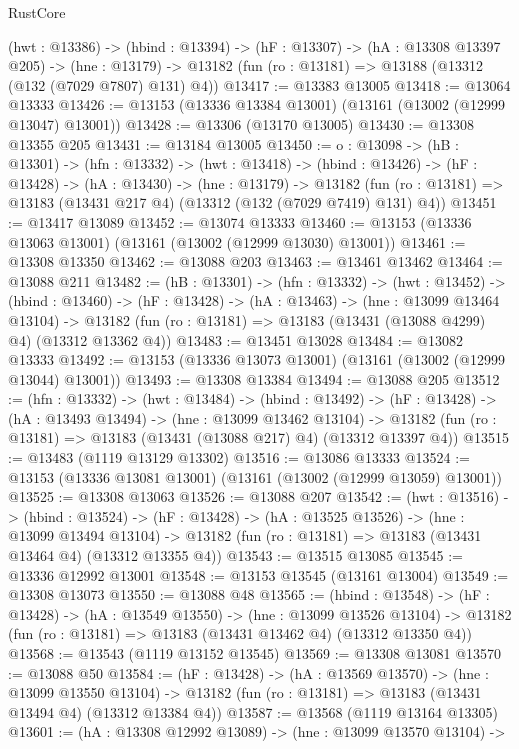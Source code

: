 \begin{lexlean}{RustCore}
\begin{coremodule}
  (hwt : @13386) ->
  (hbind : @13394) ->
  (hF : @13307) ->
  (hA : @13308 @13397 @205) ->
  (hne : @13179) -> @13182 (fun (ro : @13181) => @13188 (@13312 (@132 (@7029 @7807) @131) @4))
@13417 := @13383 @13005
@13418 := @13064 @13333
@13426 := @13153 (@13336 @13384 @13001) (@13161 (@13002 (@12999 @13047) @13001))
@13428 := @13306 (@13170 @13005)
@13430 := @13308 @13355 @205
@13431 := @13184 @13005
@13450 := {o : @13098} ->
  (hB : @13301) ->
  (hfn : @13332) ->
  (hwt : @13418) ->
  (hbind : @13426) ->
  (hF : @13428) ->
  (hA : @13430) ->
  (hne : @13179) ->
  @13182 (fun (ro : @13181) => @13183 (@13431 @217 @4) (@13312 (@132 (@7029 @7419) @131) @4))
@13451 := @13417 @13089
@13452 := @13074 @13333
@13460 := @13153 (@13336 @13063 @13001) (@13161 (@13002 (@12999 @13030) @13001))
@13461 := @13308 @13350
@13462 := @13088 @203
@13463 := @13461 @13462
@13464 := @13088 @211
@13482 := (hB : @13301) ->
  (hfn : @13332) ->
  (hwt : @13452) ->
  (hbind : @13460) ->
  (hF : @13428) ->
  (hA : @13463) ->
  (hne : @13099 @13464 @13104) ->
  @13182 (fun (ro : @13181) => @13183 (@13431 (@13088 @4299) @4) (@13312 @13362 @4))
@13483 := @13451 @13028
@13484 := @13082 @13333
@13492 := @13153 (@13336 @13073 @13001) (@13161 (@13002 (@12999 @13044) @13001))
@13493 := @13308 @13384
@13494 := @13088 @205
@13512 := (hfn : @13332) ->
  (hwt : @13484) ->
  (hbind : @13492) ->
  (hF : @13428) ->
  (hA : @13493 @13494) ->
  (hne : @13099 @13462 @13104) ->
  @13182 (fun (ro : @13181) => @13183 (@13431 (@13088 @217) @4) (@13312 @13397 @4))
@13515 := @13483 (@1119 @13129 @13302)
@13516 := @13086 @13333
@13524 := @13153 (@13336 @13081 @13001) (@13161 (@13002 (@12999 @13059) @13001))
@13525 := @13308 @13063
@13526 := @13088 @207
@13542 := (hwt : @13516) ->
  (hbind : @13524) ->
  (hF : @13428) ->
  (hA : @13525 @13526) ->
  (hne : @13099 @13494 @13104) ->
  @13182 (fun (ro : @13181) => @13183 (@13431 @13464 @4) (@13312 @13355 @4))
@13543 := @13515 @13085
@13545 := @13336 @12992 @13001
@13548 := @13153 @13545 (@13161 @13004)
@13549 := @13308 @13073
@13550 := @13088 @48
@13565 := (hbind : @13548) ->
  (hF : @13428) ->
  (hA : @13549 @13550) ->
  (hne : @13099 @13526 @13104) ->
  @13182 (fun (ro : @13181) => @13183 (@13431 @13462 @4) (@13312 @13350 @4))
@13568 := @13543 (@1119 @13152 @13545)
@13569 := @13308 @13081
@13570 := @13088 @50
@13584 := (hF : @13428) ->
  (hA : @13569 @13570) ->
  (hne : @13099 @13550 @13104) ->
  @13182 (fun (ro : @13181) => @13183 (@13431 @13494 @4) (@13312 @13384 @4))
@13587 := @13568 (@1119 @13164 @13305)
@13601 := (hA : @13308 @12992 @13089) ->
  (hne : @13099 @13570 @13104) ->

\end{coremodule}
\end{lexlean}
